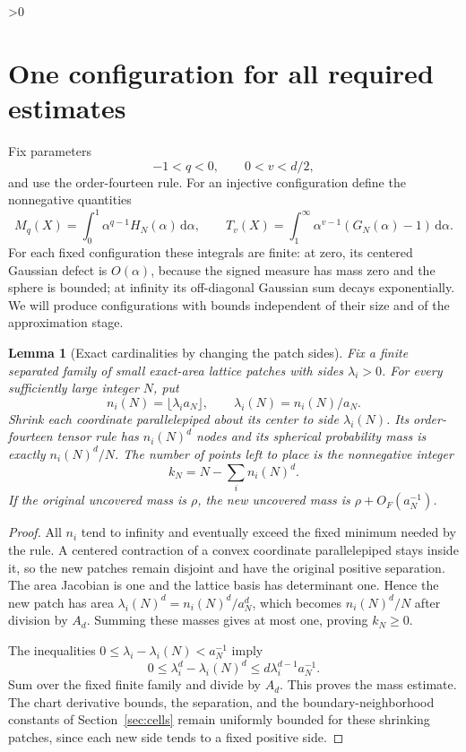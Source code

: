 \documentclass[11pt,a4paper]{article}
\newtheorem{lemma}[theorem]{Lemma}
\theoremstyle{definition}
\newcommand{\dd}{\,\mathrm d}
\numberwithin{equation}{section}
\let\originalsection\section
\renewcommand{\section}{\ifnum\value{section}>0\clearpage\fi\originalsection}
\begin{document}
\section{One configuration for all required estimates}\label{sec:positive-upper}
Fix parameters
\begin{equation}\label{eq:budget-parameters}
 -1<q<0,\qquad 0<v<d/2,
\end{equation}
and use the order-fourteen rule. For an injective configuration define the nonnegative quantities
\begin{equation}\label{eq:two-budgets}
 M_q(X)=\int_0^1\alpha^{q-1}H_N(\alpha)\dd\alpha,
 \qquad
 T_v(X)=\int_1^\infty\alpha^{v-1}(G_N(\alpha)-1)\dd\alpha.
\end{equation}
For each fixed configuration these integrals are finite: at zero, its centered Gaussian defect is $O(\alpha)$, because the signed measure has mass zero and the sphere is bounded; at infinity its off-diagonal Gaussian sum decays exponentially. We will produce configurations with bounds independent of their size and of the approximation stage.

\begin{lemma}[Exact cardinalities by changing the patch sides]\label{lem:allN-patches}
Fix a finite separated family of small exact-area lattice patches with sides $\lambda_i>0$. For every sufficiently large integer $N$, put
\begin{equation}\label{eq:floor-patch-sides}
 n_i(N)=\lfloor\lambda_i a_N\rfloor,\qquad
 \lambda_i(N)=n_i(N)/a_N.
\end{equation}
Shrink each coordinate parallelepiped about its center to side $\lambda_i(N)$. Its order-fourteen tensor rule has $n_i(N)^d$ nodes and its spherical probability mass is exactly $n_i(N)^d/N$. The number of points left to place is the nonnegative integer
\begin{equation}\label{eq:residual-count}
 k_N=N-\sum_i n_i(N)^d.
\end{equation}
If the original uncovered mass is $\rho$, the new uncovered mass is $\rho+O_F(a_N^{-1})$.
\end{lemma}
\begin{proof}
All $n_i$ tend to infinity and eventually exceed the fixed minimum needed by the rule. A centered contraction of a convex coordinate parallelepiped stays inside it, so the new patches remain disjoint and have the original positive separation. The area Jacobian is one and the lattice basis has determinant one. Hence the new patch has area $\lambda_i(N)^d=n_i(N)^d/a_N^d$, which becomes $n_i(N)^d/N$ after division by $A_d$. Summing these masses gives at most one, proving $k_N\ge0$.

The inequalities $0\le\lambda_i-\lambda_i(N)<a_N^{-1}$ imply
\[
 0\le\lambda_i^d-\lambda_i(N)^d
       \le d\lambda_i^{d-1}a_N^{-1}.
\]
Sum over the fixed finite family and divide by $A_d$. This proves the mass estimate. The chart derivative bounds, the separation, and the boundary-neighborhood constants of Section~\ref{sec:cells} remain uniformly bounded for these shrinking patches, since each new side tends to a fixed positive side.
\end{proof}
\end{document}
